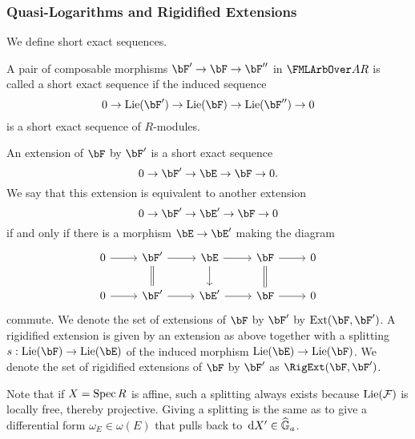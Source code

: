 \subsubsection{Quasi-Logarithms and Rigidified Extensions} %
\label{ssub:Quasi-Logarithms and Rigidified Extensions}
We define short exact sequences.
\begin{defi}
  A pair of composable morphisms $\bF' \to \bF \to \bF''$ in 
  $\FMLArbOver A R$ is called 
  a short exact sequence if the induced sequence 
  \begin{equation*}
    0 \to \Lie(\bF') \to \Lie(\bF) \to \Lie(\bF'') \to 0
  \end{equation*}
  is a short exact sequence of $R$-modules.
\end{defi}

\begin{defi}
  An extension of $\bF$ by $\bF'$ is a short exact sequence 
  \begin{equation*}
    0 \to \bF' \to \bE \to \bF \to 0.
  \end{equation*}
  We say that this extension is equivalent to another extension 
  \begin{equation*}
    0 \to \bF' \to \bE' \to \bF \to 0
  \end{equation*}
  if and only if there is a morphism $\bE \to \bE'$ making the diagram 
  \begin{equation*}
    \begin{tikzcd}[ampersand replacement=\&]
    	0 \& {\bF'} \& \bE \& \bF \& 0 \\
    	0 \& {\bF'} \& {\bE'} \& \bF \& 0
    	\arrow[from=1-1, to=1-2]
    	\arrow[from=1-2, to=1-3]
    	\arrow[Rightarrow, no head, from=1-2, to=2-2]
    	\arrow[from=1-3, to=1-4]
    	\arrow[from=1-3, to=2-3]
    	\arrow[from=1-4, to=1-5]
    	\arrow[Rightarrow, no head, from=1-4, to=2-4]
    	\arrow[from=2-1, to=2-2]
    	\arrow[from=2-2, to=2-3]
    	\arrow[from=2-3, to=2-4]
    	\arrow[from=2-4, to=2-5]
    \end{tikzcd}
  \end{equation*}
  commute. We denote the set of extensions of $\bF$ by $\bF'$ by 
  $\Ext(\bF, \bF')$. A rigidified extension is given by an extension as above
  together with a splitting $s: \Lie(\bF) \to \Lie(\bE)$ of the induced morphism
  $\Lie(\bE) \to \Lie(\bF)$. We denote the set of rigidified extensions of
  $\bF$ by $\bF'$ as $\RigExt(\bF, \bF')$.
\end{defi}
\begin{rmk} 
  Note that if $X = \operatorname{Spec} R$ is affine,  such a splitting always exists because 
  $\operatorname{Lie}(\mathcal{F})$ is locally free, thereby projective. Giving a splitting 
  is the same as to give a differential form $\omega_E \in \omega(E)$ that pulls
  back to $\, \mathrm{d} X' \in \widehat{\mathbb{G}}_a$.
\end{rmk}

